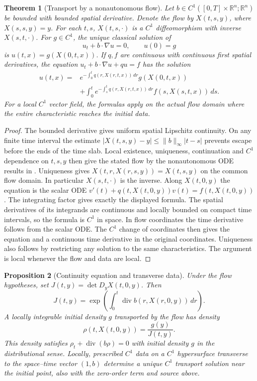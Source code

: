\documentclass[11pt,oneside,openany]{book}
\theoremstyle{plain}
\newtheorem{theorem}{Theorem}[chapter]
\newtheorem{proposition}[theorem]{Proposition}
\theoremstyle{definition}
\theoremstyle{remark}
\begin{document}
\begin{theorem}[Transport by a nonautonomous flow]\label{thm:pde-transport-flow}
Let \(b\in C^1([0,T]\times\mathbb R^n;\mathbb R^n)\) be bounded with
bounded spatial derivative. Denote the flow by \(X(t,s,y)\), where
\(X(s,s,y)=y\). For each \(t,s\), \(X(t,s,\cdot)\) is a \(C^1\)
diffeomorphism with inverse \(X(s,t,\cdot)\). For \(g\in C^1\),
the unique classical solution of
\[
 u_t+b\cdot\nabla u=0,\qquad u(0)=g
\]
is \(u(t,x)=g(X(0,t,x))\). If \(q,f\) are continuous with
continuous first spatial derivatives, the equation
\(u_t+b\cdot\nabla u+qu=f\) has the solution
\begin{align*}
 u(t,x)={}&
 e^{-\int_0^t q(r,X(r,t,x))\,dr}g(X(0,t,x))\\
 &+\int_0^t e^{-\int_s^t q(r,X(r,t,x))\,dr}
                     f(s,X(s,t,x))\,ds .
\end{align*}
For a local \(C^1\) vector field, the formulas apply on the actual
flow domain where the entire characteristic reaches the initial data.
\end{theorem}

\begin{proof}
The bounded derivative gives uniform spatial Lipschitz continuity.
On any finite time interval the estimate
\(\lvert X(t,s,y)-y\rvert\leq \|b\|_\infty |t-s|\) prevents escape
before the ends of the time slab. Local existence, uniqueness,
continuation and \(C^1\) dependence on \(t,s,y\) then give the stated
flow by the nonautonomous ODE results in
\cite[Chapters 3, 4 and 6]{D13}. Uniqueness gives
\(X(t,r,X(r,s,y))=X(t,s,y)\) on the common flow domain. In particular
\(X(s,t,\cdot)\) is the inverse. Along \(X(t,0,y)\) the equation is
the scalar ODE \(v'(t)+q(t,X(t,0,y))v(t)=f(t,X(t,0,y))\).
The integrating factor gives exactly the displayed formula.
The spatial derivatives of its integrands are continuous and
locally bounded on compact time intervals, so the formula is
\(C^1\) in space. In flow coordinates the time derivative follows
from the scalar ODE. The \(C^1\) change of coordinates then gives
the equation and a continuous time derivative in the original
coordinates. Uniqueness also follows by restricting any solution
to the same characteristics. The argument is local whenever the
flow and data are local.
\end{proof}

\begin{proposition}[Continuity equation and transverse data]\label{prop:pde-transport-jacobian}
Under the flow hypotheses, set \(J(t,y)=\det D_yX(t,0,y)\).
Then
\[
 J(t,y)=\exp\left(\int_0^t
             \operatorname{div}b(r,X(r,0,y))\,dr\right).
\]
A locally integrable initial density \(g\) transported by the
flow has density
\[
 \rho(t,X(t,0,y))=\frac{g(y)}{J(t,y)} .
\]
This density satisfies
\(\rho_t+\operatorname{div}(b\rho)=0\) with initial density \(g\)
in the distributional sense. Locally, prescribed \(C^1\) data on
a \(C^1\) hypersurface transverse to the space--time vector
\((1,b)\) determine a unique \(C^1\) transport solution near
the initial point, also with the zero-order term and source above.
\end{proposition}
\end{document}

